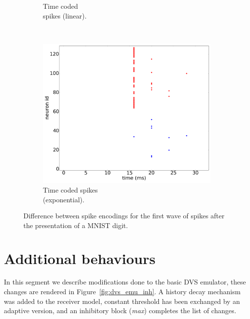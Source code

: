 \documentclass[conference]{IEEEtran}
\begin{document}
\begin{figure}[hbt]
\begin{subfigure}[b]{0.32\textwidth}
    \caption{Time coded\\spikes (linear).}
    \label{fig:time_spikes}
  \end{subfigure}~
  \begin{subfigure}[b]{0.32\textwidth}
    \includegraphics[width=\textwidth]{time_exp_coded_-8x8-_cycle_0}
    \caption{Time coded spikes \\(exponential).}
    \label{fig:time_exp_spikes}
  \end{subfigure}
  
  \caption{Difference between spike encodings for the first wave of spikes after the presentation of a MNIST digit.}
  \label{fig:spike_codes}
\end{figure}

\section{Additional behaviours}
\label{sec:additional-behaviours}
In this segment we describe modifications done to the basic DVS emulator, these changes are rendered in Figure~\ref{fig:dvs_emu_inh}. A history decay mechanism was added to the receiver model, constant threshold has been exchanged by an adaptive version, and an inhibitory block (\textit{\textsf{max}}) completes the list of changes.
\end{document}
